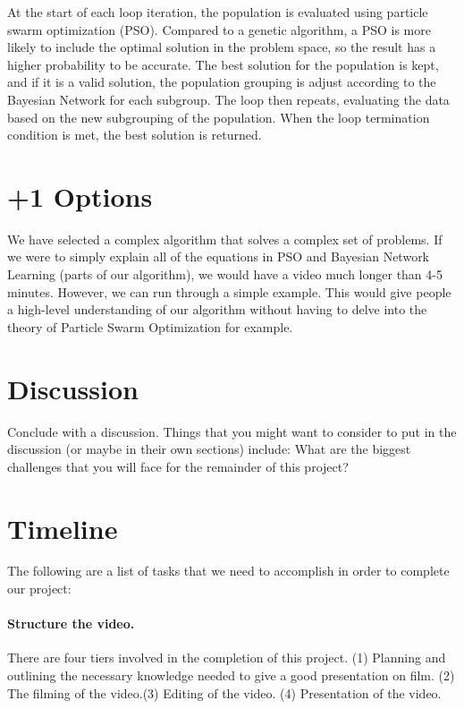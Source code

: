 \documentclass[11pt,twocolumn]{article}
\begin{document}
At the start of each loop iteration, the population is evaluated using particle swarm optimization (PSO). Compared to a genetic algorithm, a PSO is more likely to include the optimal solution in the problem space, so the result has a higher probability to be accurate\cite{sun2015bayesian}. The best solution for the population is kept, and if it is a valid solution, the population grouping is adjust according to the Bayesian Network for each subgroup. The loop then repeats, evaluating the data based on the new subgrouping of the population. When the loop termination condition is met, the best solution is returned.

\section{+1 Options}
We have selected a complex algorithm that solves a complex set of problems. If we were to simply explain all of the equations in PSO and Bayesian Network Learning (parts of our algorithm), we would have a video much longer than 4-5 minutes. However, we can run through a simple example. This would give people a high-level understanding of our algorithm without having to delve into the theory of Particle Swarm Optimization for example. 

\section{Discussion}
Conclude with a discussion.  Things that you might want to consider to put in 
the discussion (or maybe in their own sections) include: What are the biggest 
challenges that you will face for the remainder of this project?  


 

\newpage
\appendix
\section{Timeline}
The following are a list of tasks that we need to accomplish in order to 
complete our project:

\paragraph{Structure the video.} There are four tiers involved in the completion of this project. (1) Planning and outlining the necessary knowledge needed to give a good presentation on film. (2) The filming of the video.(3) Editing of the video. (4) Presentation of the video.
\end{document}
